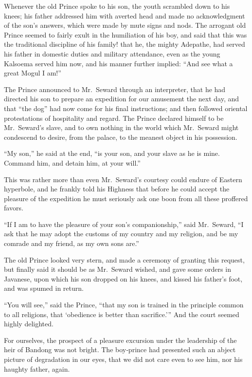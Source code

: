 \documentclass[12pt]{book}
\begin{document}
Whenever the old Prince spoke to his son, the youth scrambled down to his
knees; his father addressed him with averted head and made no acknowledgment
of the son’s answers, which were made by mute signs and nods. The arrogant
old Prince seemed to fairly exult in the humiliation of his boy, and said that this
was the traditional discipline of his family! that he, the mighty Adepathe, had
served his father in domestic duties and military attendance, even as the young
Kalsoema served him now, and his manner further implied: “And see what a great
Mogul I am!”

The Prince announced to Mr.~Seward through an interpreter, that he had
directed his son to prepare an expedition for our amusement the next day, and
that “the dog” had now come for his final instructions; and then followed oriental protestations of hospitality and regard. The Prince declared himself to be
Mr.~Seward’s slave, and to own nothing in the world which Mr.~Seward might
condescend to desire, from the palace, to the meanest object in his possession.

“My son,” he said at the end, “is your son, and your slave as he is mine.
Command him, and detain him, at your will.”

This was rather more than even Mr.~Seward’s courtesy could endure of
Eastern hyperbole, and he frankly told his Highness that before he could accept
the pleasure of the expedition he must seriously ask one boon from all these
proffered favors.

“If I am to have the pleasure of your son’s companionship,” said Mr.~Seward,
“I ask that he may adopt the customs of my country and my religion, and be my
comrade and my friend, as my own sons are.”

The old Prince looked very stern, and made a ceremony of granting this
request, but finally said it should be as Mr.~Seward wished, and gave some orders
in Javanese, upon which his son dropped on his knees, and kissed his father’s
foot, and was spumed in return.

“You will see,” said the Prince, “that my son is trained in the principle common
to all religions, that ‘obedience is better than sacrifice.’” And the court seemed
highly delighted.

For ourselves, the prospect of a pleasure excursion under the leadership of
the heir of Bandong was not bright. The boy‐prince had presented such an abject
picture of degradation in our eyes, that we did not care even to see him, nor his
haughty father, again.
\end{document}
